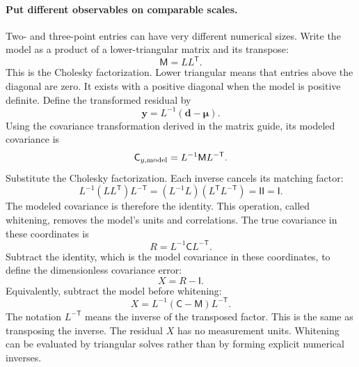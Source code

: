 \documentclass[11pt]{article}
\newcommand{\Cov}{\mathsf{C}}
\newcommand{\M}{\mathsf{M}}
\newcommand{\I}{\mathsf{I}}
\newcommand{\T}{^{\mathsf{T}}}
\begin{document}
\paragraph{Put different observables on comparable scales.}
Two- and three-point entries can have very different numerical sizes.
Write the model as a product of a lower-triangular matrix and its transpose:
\begin{equation}
 \M=L L\T.
\end{equation}
This is the Cholesky factorization. Lower triangular means that entries
above the diagonal are zero. It exists with a positive diagonal when the
model is positive definite. Define the transformed residual by
\begin{equation}
 \boldsymbol y=L^{-1}(\boldsymbol d-\boldsymbol\mu).
\end{equation}
Using the covariance transformation derived in the matrix guide, its
modeled covariance is
\begin{equation}
 \Cov_{y,\rm model}=L^{-1}\M L^{-\mathsf T}.
\end{equation}
Substitute the Cholesky factorization. Each inverse cancels its matching
factor:
\begin{equation}
 L^{-1}(L L\T)L^{-\mathsf T}
   =(L^{-1}L)(L\T L^{-\mathsf T})=\I\I=\I.
\end{equation}
The modeled covariance is therefore the identity. This operation, called whitening,
removes the model's units and correlations. The true covariance in these
coordinates is
\begin{equation}
 R=L^{-1}\Cov L^{-\mathsf T}.
\end{equation}
Subtract the identity, which is the model covariance in these coordinates,
to define the dimensionless covariance error:
\begin{equation}
 X=R-\I.
\end{equation}
Equivalently, subtract the model before whitening:
\begin{equation}
 X=L^{-1}(\Cov-\M)L^{-\mathsf T}.
\end{equation}
The notation $L^{-\mathsf T}$ means the inverse of the transposed factor.
This is the same as transposing the inverse. The residual $X$ has no
measurement units. Whitening can be evaluated by triangular solves rather than by
forming explicit numerical inverses.
\end{document}
